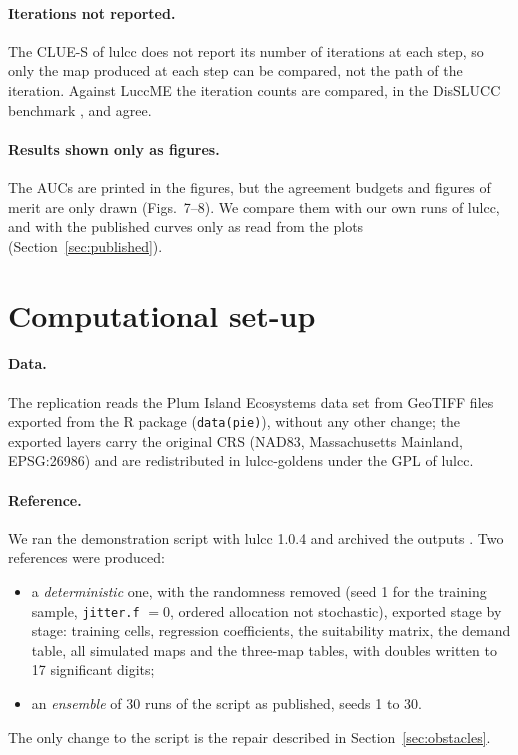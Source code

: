 \paragraph{Iterations not reported.} The CLUE-S of lulcc does not report its number of iterations at each step, so only the map produced at each step can be compared, not the path
of the iteration. Against LuccME the iteration counts are compared, in the DisSLUCC benchmark
\supercite{DisSLUCCbenchmark:2026}, and agree.

\paragraph{Results shown only as figures.} The AUCs are printed in the figures, but the
agreement budgets and figures of merit are only drawn (Figs.~7--8). We compare them with our own runs of lulcc, and with the published curves only as read
from the plots (Section~\ref{sec:published}).

\section{Computational set-up}
\label{sec:setup}

\paragraph{Data.} The replication reads the Plum Island Ecosystems data set from GeoTIFF
files exported from the R package (\texttt{data(pie)}), without any other change; the exported layers carry the original CRS (NAD83, Massachusetts Mainland, EPSG:26986)
and are redistributed in lulcc-goldens under the GPL of lulcc.

\paragraph{Reference.} We ran the demonstration script with lulcc 1.0.4
\supercite{lulcc:2019} and archived the outputs \supercite{lulccgoldens:2026}. Two
references were produced:
\begin{itemize}
  \item a \emph{deterministic} one, with the randomness removed (seed 1 for the
    training sample, \texttt{jitter.f} $= 0$, ordered allocation not stochastic),
    exported stage by stage: training cells, regression coefficients, the suitability
    matrix, the demand table, all simulated maps and the three-map tables, with doubles
    written to 17 significant digits;
  \item an \emph{ensemble} of 30 runs of the script as published, seeds 1 to 30.
\end{itemize}
The only change to the script is the repair described in
Section~\ref{sec:obstacles}.

